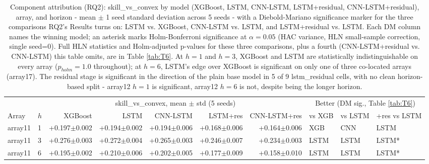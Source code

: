 \begin{table}[t]
  \centering
  \scriptsize
  \caption{Component attribution (RQ2): skill\_vs\_convex by model (XGBoost, LSTM, CNN-LSTM, LSTM+residual, CNN-LSTM+residual), array, and horizon - mean $\pm$ 1 seed standard deviation across 5 seeds - with a Diebold-Mariano significance marker for the three comparisons RQ2's Results turns on: LSTM vs. XGBoost, CNN-LSTM vs. LSTM, and LSTM+residual vs. LSTM. Each DM column names the winning model; an asterisk marks Holm-Bonferroni significance at $\alpha=0.05$ (HAC variance, HLN small-sample correction, single seed=0). Full HLN statistics and Holm-adjusted p-values for these three comparisons, plus a fourth (CNN-LSTM+residual vs. CNN-LSTM) this table omits, are in Table \ref{tab:T6}. At $h=1$ and $h=3$, XGBoost and LSTM are statistically indistinguishable on every array ($p_{holm}=1.0$ throughout); at $h=6$, LSTM's edge over XGBoost is significant on only one of three co-located arrays (array17). The residual stage is significant in the direction of the plain base model in 5 of 9 lstm\_residual cells, with no clean horizon-based split - array12 $h=1$ is significant, array12 $h=6$ is not, despite being the longer horizon.}
  \label{tab:T5}
  \begin{tabular}{ll rrrrr lll}
    \toprule
    & & \multicolumn{5}{c}{skill\_vs\_convex, mean $\pm$ std (5 seeds)} & \multicolumn{3}{c}{Better (DM sig., Table \ref{tab:T6})} \\
    \cmidrule(lr){3-7} \cmidrule(lr){8-10}
    Array & $h$ & XGBoost & LSTM & CNN-LSTM & LSTM+res & CNN-LSTM+res & vs XGB & vs LSTM & +res vs LSTM \\
    \midrule
    array11 & 1 & +0.197$\pm$0.002 & +0.194$\pm$0.002 & +0.194$\pm$0.006 & +0.168$\pm$0.006 & +0.164$\pm$0.006 & XGB & CNN & LSTM \\
    array11 & 3 & +0.276$\pm$0.003 & +0.272$\pm$0.004 & +0.265$\pm$0.003 & +0.246$\pm$0.007 & +0.234$\pm$0.003 & LSTM & LSTM & LSTM* \\
    array11 & 6 & +0.195$\pm$0.002 & +0.210$\pm$0.006 & +0.202$\pm$0.005 & +0.177$\pm$0.009 & +0.158$\pm$0.010 & LSTM & LSTM & LSTM* \\

\end{tabular}
\end{table}
